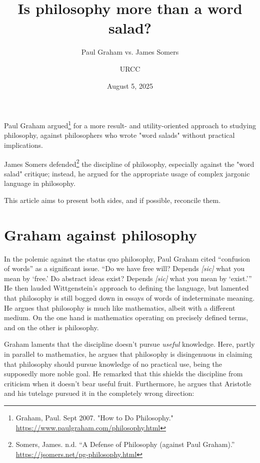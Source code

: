 \documentclass[12pt]{article}
\begin{document}
\title{Is philosophy more than a word salad?}
\subtitle{Paul Graham vs. James Somers}  %
\author{URCC}
\date{August 5, 2025}
\maketitle

\begin{preamble}
 Paul Graham argued\footnote{Graham, Paul. Sept 2007. "How to Do Philosophy." \href{https://www.paulgraham.com/philosophy.html}{https://www.paulgraham.com/philosophy.html}} for a more result- and utility-oriented approach to studying philosophy, against philosophers who wrote  "word salads" without practical implications.

 James Somers defended\footnote{Somers, James. n.d. \enquote{A Defense of Philosophy (against Paul Graham).} \href{https://jsomers.net/pg-philosophy.html}{https://jsomers.net/pg-philosophy.html}} the discipline of philosophy, especially against the "word salad" critique; instead, he argued for the appropriate usage of complex jargonic language in philosophy.

 This article aims to present both sides, and if possible, reconcile them.
\end{preamble}

\section{Graham against philosophy}

In the polemic against the status quo philosophy, Paul Graham cited \enquote{confusion of words} as a significant issue. \enquote{Do we have free will? Depends \emph{[sic]} what you mean by \enquote{free.} Do abstract ideas exist? Depends \emph{[sic]} what you mean by \enquote{exist.}} He then lauded Wittgenstein's approach to defining the language, but lamented that philosophy is still bogged down in essays of words of indeterminate meaning. He argues that philosophy is much like mathematics, albeit with a different medium. On the one hand is mathematics operating on precisely defined terms, and on the other is philosophy.

Graham laments that the discipline doesn't pursue \emph{useful} knowledge. Here, partly in parallel to mathematics, he argues that philosophy is disingenuous in claiming that philosophy should pursue knowledge of no practical use, being the supposedly more noble goal. He remarked that this shields the discipline from criticism when it doesn't bear useful fruit. Furthermore, he argues that Aristotle and his tutelage pursued it in the completely wrong direction:
\end{document}
